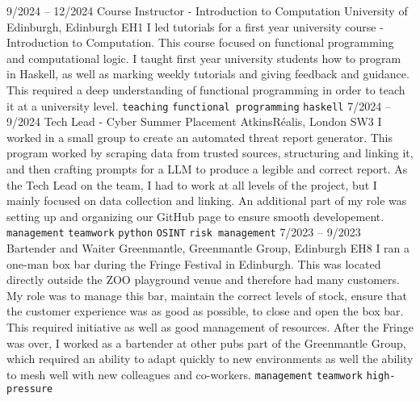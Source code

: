 \documentclass[9pt]{developercv} %
\begin{document}
\vspace{-10 pt}
\begin{entrylist}
	\entry
	{9/2024 --  12/2024}
	{Course Instructor - Introduction to Computation}
	{University of Edinburgh, Edinburgh EH1}
	{
		I led tutorials for a first year university course - Introduction to Computation.
		This course focused on functional programming and computational logic.
		I taught first year university students how to program in Haskell, as well as marking weekly tutorials and giving feedback and guidance.
		This required a deep understanding of functional programming in order to teach it at a university level.
		\newline
		\texttt{teaching} \slashsep \texttt{functional programming} \slashsep \texttt{haskell}
	}
	\entry
	{7/2024 --  9/2024}
	{Tech Lead - Cyber Summer Placement}
	{AtkinsRéalis, London SW3}
	{
		I worked in a small group to create an automated threat report generator.
		This program worked by scraping data from trusted sources, structuring and linking it, and then crafting prompts for a LLM to produce a legible and correct report.
		As the Tech Lead on the team, I had to work at all levels of the project, but I mainly focused on data collection and linking.
		An additional part of my role was setting up and organizing our GitHub page to ensure smooth developement.
		\newline
		\texttt{management} \slashsep \texttt{teamwork} \slashsep \texttt{python} \slashsep \texttt{OSINT} \slashsep \texttt{risk management}
	}
	\entry
        {7/2023 --  9/2023}
		{Bartender and Waiter}
		{Greenmantle, Greenmantle Group, Edinburgh EH8}
		{
			I ran a one-man box bar during the Fringe Festival in Edinburgh. 
			This was located directly outside the ZOO playground venue and therefore had many customers.
			My role was to manage this bar, maintain the correct levels of stock, ensure that the customer experience was as good as possible, to close and open the box bar.
			This required initiative as well as good management of resources.
			After the Fringe was over, I worked as a bartender at other pubs part of the Greenmantle Group, which required an ability to adapt quickly to new environments as well the ability to mesh well with new colleagues and co-workers.
        	\newline
			\texttt{management} \slashsep \texttt{teamwork} \slashsep \texttt{high-pressure}
		}
\end{entrylist}
\end{document}

